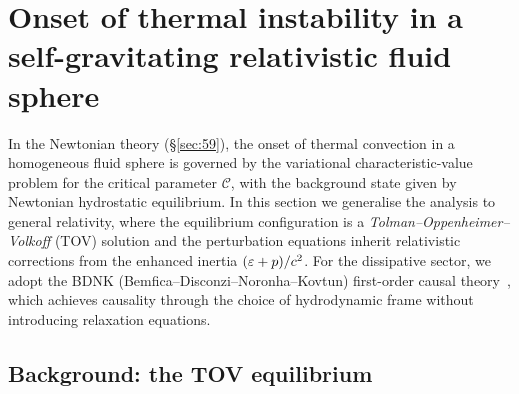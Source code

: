 %

\section{Onset of thermal instability in a self-gravitating relativistic
fluid sphere}
\label{sec:rel-59}

In the Newtonian theory (\S\ref{sec:59}), the onset of thermal
convection in a homogeneous fluid sphere is governed by the variational
characteristic-value problem for the critical parameter $\mathcal{C}$,
with the background state given by Newtonian hydrostatic equilibrium.
In this section we generalise the analysis to general relativity, where
the equilibrium configuration is a \emph{Tolman--Oppenheimer--Volkoff}
(TOV) solution and the perturbation equations inherit relativistic
corrections from the enhanced inertia
$(\varepsilon + p)/c^{2}$.  For the dissipative sector, we adopt the
BDNK (Bemfica--Disconzi--Noronha--Kovtun) first-order causal
theory~\cite{BemficaDN2018,Kovtun2019,BemficaDN2019}, which achieves
causality through the choice of hydrodynamic frame without introducing
relaxation equations.

\subsection{Background: the TOV equilibrium}
\label{sec:rel-59-TOV}

